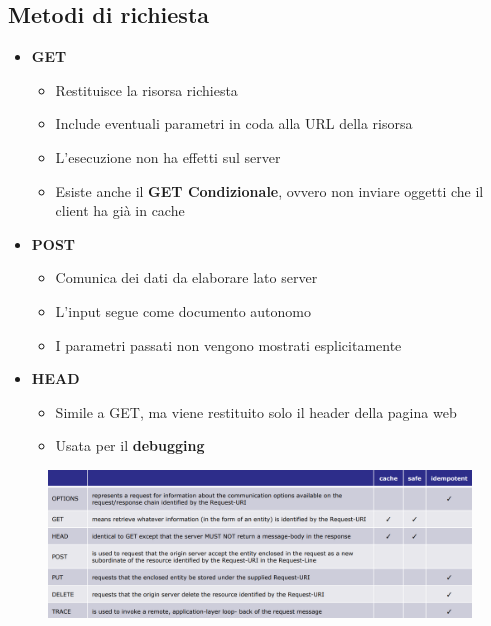 \documentclass[12pt, a4paper]{article}
\begin{document}
    \subsection*{Metodi di richiesta}
    \begin{itemize}
        \item \textbf{GET}
            \begin{itemize}
                \item Restituisce la risorsa richiesta
                \item Include eventuali parametri in coda alla URL della risorsa
                \item L'esecuzione non ha effetti sul server
                \item Esiste anche il \textbf{GET Condizionale}, ovvero non inviare oggetti che il client ha già in cache
            \end{itemize}
            \item \textbf{POST}
            \begin{itemize}
                \item Comunica dei dati da elaborare lato server
                \item L'input segue come documento autonomo
                \item I parametri passati non vengono mostrati esplicitamente
            \end{itemize}
            \item \textbf{HEAD}
            \begin{itemize}
                \item Simile a GET, ma viene restituito solo il header della pagina web
                \item Usata per il \textbf{debugging}
            \end{itemize}
    \end{itemize}

    \begin{figure}[htbp]
        \centering
        \includegraphics[scale=0.4]{metodi.png}
    \end{figure}
\end{document}
